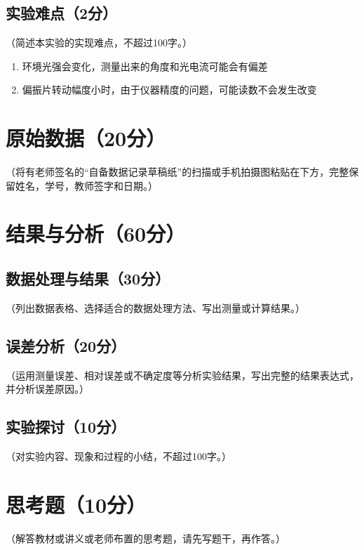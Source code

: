 \documentclass[yuxi]{../template/Report}%
\begin{document}
\subsection{实验难点（2分）}
（简述本实验的实现难点，不超过100字。）
\begin{enumerate}
    \item 环境光强会变化，测量出来的角度和光电流可能会有偏差
    \item 偏振片转动幅度小时，由于仪器精度的问题，可能读数不会发生改变
\end{enumerate}
\begin{fullreportonly}
\section{原始数据（20分）}
（将有老师签名的“自备数据记录草稿纸”的扫描或手机拍摄图粘贴在下方，完整保留姓名，学号，教师签字和日期。）

\section{结果与分析（60分）}
\subsection{数据处理与结果（30分）}
（列出数据表格、选择适合的数据处理方法、写出测量或计算结果。）

\subsection{误差分析（20分）}
（运用测量误差、相对误差或不确定度等分析实验结果，写出完整的结果表达式，并分析误差原因。）

\subsection{实验探讨（10分）}
（对实验内容、现象和过程的小结，不超过100字。）

\section{思考题（10分）}
（解答教材或讲义或老师布置的思考题，请先写题干，再作答。）
\end{fullreportonly}
\insertnotes
\end{document}
